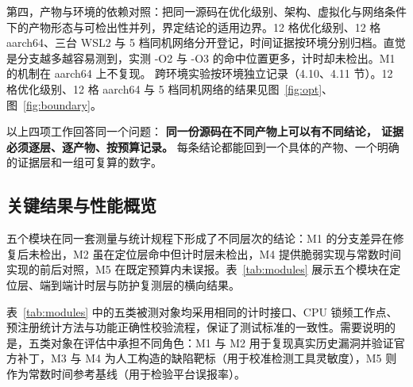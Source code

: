 第四，产物与环境的依赖对照：把同一源码在优化级别、架构、虚拟化与网络条件下的产物形态与可检出性并列，界定结论的适用边界。12 格优化级别、12 格 aarch64、三台 WSL2 与 5 档同机网络分开登记，时间证据按环境分别归档。直觉是分支越多越容易测到，实测 -O2 与 -O3 的命中位置更多，计时却未检出。M1 的机制在 aarch64 上不复现。%
跨环境实验按环境独立记录（4.10、4.11 节）。12 格优化级别、12 格 aarch64 与 5 档同机网络的结果见图~\ref{fig:opt}、图~\ref{fig:boundary}。

以上四项工作回答同一个问题：
\textbf{同一份源码在不同产物上可以有不同结论，
证据必须逐层、逐产物、按预算记录。}
每条结论都能回到一个具体的产物、一个明确的证据层和一组可复算的数字。

\subsection{关键结果与性能概览}

五个模块在同一套测量与统计规程下形成了不同层次的结论：M1 的分支差异在修复后未检出，M2 虽在定位层命中但计时层未检出，M4 提供脆弱实现与常数时间实现的前后对照，M5 在既定预算内未误报。表~\ref{tab:modules} 展示五个模块在定位层、端到端计时层与防护复测层的横向结果。

表~\ref{tab:modules} 中的五类被测对象均采用相同的计时接口、CPU 锁频工作点、预注册统计方法与功能正确性校验流程，保证了测试标准的一致性。需要说明的是，五类对象在评估中承担不同角色：M1 与 M2 用于复现真实历史漏洞并验证官方补丁，M3 与 M4 为人工构造的缺陷靶标（用于校准检测工具灵敏度），M5 则作为常数时间参考基线（用于检验平台误报率）。

